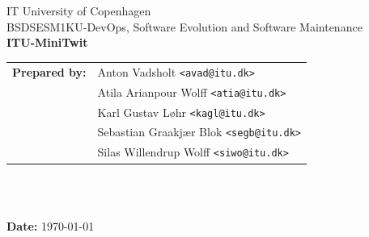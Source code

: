 \documentclass[12pt]{article}
\makeatletter
\def \LOGOPATH {images/ITU.svg}
\def \DEPARTEMENT {IT University of Copenhagen}
\def \COURSENUM {BSDSESM1KU}
\def \COURSENAME {DevOps, Software Evolution and Software Maintenance}
\def \REPORTTITLE {ITU-MiniTwit}
\def \STUDENTNAME {
    \begin{tabular}{@{}l@{\hspace{2em}}l}
        \textbf{Prepared by:} & Anton Vadsholt \texttt{<avad@itu.dk>}
        \\ & Atila Arianpour Wolff \texttt{<atia@itu.dk>}
        \\ & Karl Gustav Løhr \texttt{<kagl@itu.dk>} 
        \\ & Sebastian Graakjær Blok \texttt{<segb@itu.dk>}
        \\ & Silas Willendrup Wolff \texttt{<siwo@itu.dk>}
    \end{tabular}
    \vspace{0.5cm}
}
\makeatother
\begin{document}
\begin{titlepage}
    \vfill
    \begin{center}
         \\
        \hfill \\
        \Large{\DEPARTEMENT} \\
        \Large{\COURSENUM\;-\;\COURSENAME} \\
        \vfill
        \textbf{\LARGE{\REPORTTITLE}}
    \end{center}
    \vfill
    \begin{flushleft}
        \Large{\STUDENTNAME} \\
        \Large{\INSTRUCTOR} \\
    \end{flushleft}
    \vfill
    \begin{center}
        \Large{\textbf{Date:} \today}
    \end{center}
\end{titlepage}

%

\newpage
\tableofcontents

\newpage





%
%
\end{document}
